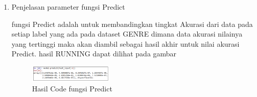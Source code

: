 \begin{enumerate}
            \item Penjelasan parameter fungsi Predict
            
            
            
            \subitem fungsi Predict adalah untuk membandingkan tingkat Akurasi dari data pada setiap label yang ada pada dataset GENRE dimana data akurasi nilainya yang tertinggi maka akan diambil sebagai hasil akhir untuk nilai akurasi Predict. hasil RUNNING dapat dilihat pada gambar
            
            \begin{figure}[H]
                \includegraphics[width=4cm]{figures/1174040/chapter6/12.png}
                \centering
                  \caption{Hasil Code fungsi Predict}
            \end{figure}
            \end{enumerate}